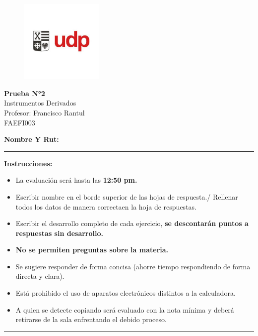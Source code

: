 \documentclass[10pt]{article}
\begin{document}
  \begin{figure}
      \vspace{-5em}    
      \flushright
      \includegraphics[height=4cm]{../logo.png}\\[-3em]
  \end{figure}
  
  \begin{center}
      {\LARGE \textbf{Prueba N°2}}\\[0.5em]
      Instrumentos Derivados \\
      Profesor: Francisco Rantul\\
      FAEFI003\\
  \end{center}
  \vspace{1pt}
  \textbf{Nombre Y Rut:}\\
  {\color{rojoudp}\hrule height 1pt}
  \vspace{1em}

  \textbf{Instrucciones:}
  \begin{itemize}
      \item La evaluación será hasta las \textbf{12:50 pm.}
      \item Escribir nombre en el borde superior de las hojas de respuesta./ Rellenar todos los datos de manera correctaen la hoja de respuestas.
      \item Escribir el desarrollo completo de cada ejercicio, \textbf{se descontarán puntos a respuestas sin desarrollo.}
      \item \textbf{No se permiten preguntas sobre la materia.}
      \item Se sugiere responder de forma concisa (ahorre tiempo respondiendo de forma directa y clara).
      \item Está prohibido el uso de aparatos electrónicos distintos a la calculadora.
      \item A quien se detecte copiando será evaluado con la nota mínima y deberá retirarse de la sala enfrentando el debido proceso.
  \end{itemize}
  {\color{rojoudp}\hrule height 1pt}
  \vspace{1em}
\end{document}
